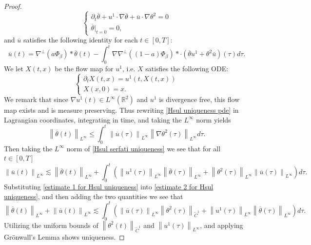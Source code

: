 \documentclass[12pt,xcolor=svgnames]{amsart}
\newcommand{\R}{\mathbb{R}}
\newcommand{\norm}[2]{\left\lVert#1\right\rVert_{#2}}
\begin{document}
\begin{proof}
\begin{equation}\begin{cases}
\label{Hsul uniqueness pde}
\partial_t\overline{\theta}+u^1\cdot\nabla\overline{\theta}+\overline{u}\cdot\nabla\theta^2=0 \\
\overline{\theta}\vert_{t=0}=0,
\end{cases}
\end{equation}
and $\overline{u}$ satisfies the following identity for each $t\in [0,T]$:
\begin{equation}
\label{Hsul serfati uniqueness}
\overline{u}(t)=\nabla^{\perp}(a\Phi_{\beta})\ast\overline{\theta}(t)-\int_0^t\nabla\nabla^{\perp}((1-a)\Phi_{\beta})\ast\cdot(\overline{\theta}u^1+\theta^2\overline{u})(\tau)d\tau.
\end{equation}
We let $X(t,x)$ be the flow map for $u^1$, i.e. $X$ satisfies the following ODE:
\begin{equation}
\label{u1 flow map}
\begin{cases}
\partial_t X(t,x) = u^1(t,X(t,x))\\
X(x,0)=x.
\end{cases}
\end{equation}
We remark that since $\nabla u^1(t) \in L^{\infty}(\R^2)$ and $u^1$ is divergence free, this flow map exists and is measure preserving. Thus rewriting \eqref{Hsul uniqueness pde} in Lagrangian coordinates, integrating in time, and taking the $L^{\infty}$ norm yields
\begin{equation}
\label{estimate 1 for Hsul uniqueness}
\norm{\overline{\theta}(t)}{L^{\infty}} \leq \int_0^t \norm{\overline{u}(\tau)}{L^{\infty}}\norm{\nabla \theta^2(\tau)}{L^{\infty}}d\tau.
\end{equation}
Then taking the $L^{\infty}$ norm of \eqref{Hsul serfati uniqueness} we see that for all $t \in [0,T]$
\begin{equation}
\label{estimate 2 for Hsul uniqueness}
\norm{\overline{u}(t)}{L^{\infty}} \lesssim \norm{\overline{\theta}(t)}{L^{\infty}}+ \int_0^t \left(\norm{u^1(\tau)}{L^{\infty}}\norm{\overline{\theta}(\tau)}{L^{\infty}} + \norm{\theta^2(\tau)}{L^{\infty}}\norm{\overline{u}(\tau)}{L^{\infty}}\right)d\tau.
\end{equation}
Substituting \eqref{estimate 1 for Hsul uniqueness} into \eqref{estimate 2 for Hsul uniqueness}, and then adding the two quantities we see that 
$$
\norm{\overline{\theta}(t)}{L^{\infty}}+\norm{\overline{u}(t)}{L^{\infty}} \lesssim \int_0^t \left( \norm{\overline{u}(\tau)}{L^{\infty}}\norm{ \theta^2(\tau)}{\tilde{C}^1} + \norm{u^1(\tau)}{L^{\infty}}\norm{\overline{\theta}(\tau)}{L^{\infty}}\right)d\tau.
$$
Utilizing the uniform bounds of $\norm{\theta^2(t)}{\tilde{C}^1}$ and $\norm{u^1(\tau)}{L^{\infty}}$, and applying Grönwall's Lemma shows uniqueness.
\end{proof}
\end{document}
